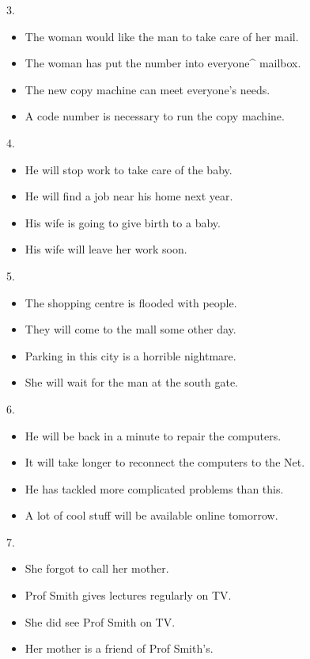 \documentclass[UTF8,11pt]{ctexart}
\begin{document}
3.


\begin{itemize}[leftmargin=2em,itemsep=.2em,topsep=.4em]\item[A.] The woman would like the man to take care of her mail.
\item[B.] The woman has put the number into everyone\textasciicircum{} mailbox.
\item[C.] The new copy machine can meet everyone’s needs.
\item[D.] A code number is necessary to run the copy machine.
\end{itemize}

4.


\begin{itemize}[leftmargin=2em,itemsep=.2em,topsep=.4em]\item[A.] He will stop work to take care of the baby.
\item[B.] He will find a job near his home next year.
\item[C.] His wife is going to give birth to a baby.
\item[D.] His wife will leave her work soon.
\end{itemize}

5.


\begin{itemize}[leftmargin=2em,itemsep=.2em,topsep=.4em]\item[A.] The shopping centre is flooded with people.
\item[B.] They will come to the mall some other day.
\item[C.] Parking in this city is a horrible nightmare.
\item[D.] She will wait for the man at the south gate.
\end{itemize}

6.


\begin{itemize}[leftmargin=2em,itemsep=.2em,topsep=.4em]\item[A.] He will be back in a minute to repair the computers.
\item[B.] It will take longer to reconnect the computers to the Net.
\item[C.] He has tackled more complicated problems than this.
\item[D.] A lot of cool stuff will be available online tomorrow.
\end{itemize}

7.


\begin{itemize}[leftmargin=2em,itemsep=.2em,topsep=.4em]\item[A.] She forgot to call her mother.
\item[B.] Prof Smith gives lectures regularly on TV.
\item[C.] She did see Prof Smith on TV.
\item[D.] Her mother is a friend of Prof Smith’s.
\end{itemize}
\end{document}
